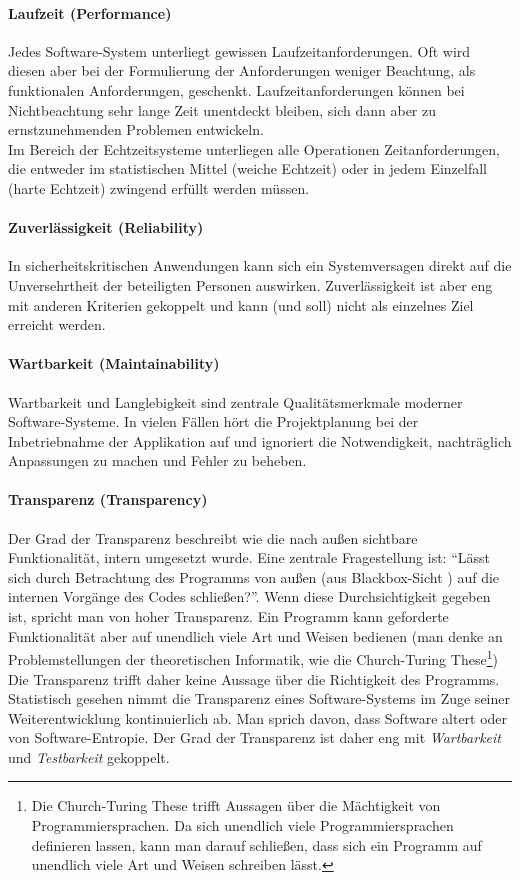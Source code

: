 \paragraph{Laufzeit (Performance)} Jedes Software-System unterliegt gewissen Laufzeitanforderungen. Oft wird diesen aber bei der Formulierung der Anforderungen weniger Beachtung, als funktionalen Anforderungen, geschenkt. Laufzeitanforderungen können bei Nichtbeachtung sehr lange Zeit unentdeckt bleiben, sich dann aber zu ernstzunehmenden Problemen entwickeln.\\
Im Bereich der Echtzeitsysteme unterliegen alle Operationen Zeitanforderungen, die entweder im statistischen Mittel (weiche Echtzeit) oder in jedem Einzelfall (harte Echtzeit) zwingend erfüllt werden müssen. \cite{hoffmann_software-qualitat_2013}

\paragraph{Zuverlässigkeit (Reliability)} In sicherheitskritischen Anwendungen kann sich ein Systemversagen direkt auf die Unversehrtheit der beteiligten Personen auswirken. Zuverlässigkeit ist aber eng mit anderen Kriterien gekoppelt und kann (und soll) nicht als einzelnes Ziel erreicht werden.

\paragraph{Wartbarkeit (Maintainability)} Wartbarkeit und Langlebigkeit sind zentrale Qualitätsmerkmale moderner Software-Systeme. \cite{rombach_design_2009} In vielen Fällen hört die Projektplanung bei der Inbetriebnahme der Applikation auf und ignoriert die Notwendigkeit, nachträglich Anpassungen zu machen und Fehler zu beheben.

\paragraph{Transparenz (Transparency)} Der Grad der Transparenz beschreibt wie die nach außen sichtbare Funktionalität, intern umgesetzt wurde. Eine zentrale Fragestellung ist: ``Lässt sich durch Betrachtung des Programms von außen (aus Blackbox-Sicht ) auf die internen Vorgänge des Codes schließen?''. Wenn diese Durchsichtigkeit gegeben ist, spricht man von hoher Transparenz. Ein Programm kann geforderte Funktionalität aber auf unendlich viele Art und Weisen bedienen (man denke an Problemstellungen der theoretischen Informatik, wie die Church-Turing These\footnote{Die Church-Turing These trifft Aussagen über die Mächtigkeit von Programmiersprachen. \cite{hoffmann_theoretische_2011} Da sich unendlich viele Programmiersprachen definieren lassen, kann man darauf schließen, dass sich ein Programm auf unendlich viele Art und Weisen schreiben lässt.}) Die Transparenz trifft daher keine Aussage über die Richtigkeit des Programms. Statistisch gesehen nimmt die Transparenz eines Software-Systems im Zuge seiner Weiterentwicklung kontinuierlich ab.\cite{hoffmann_software-qualitat_2013} Man sprich davon, dass Software altert oder von Software-Entropie. Der Grad der Transparenz ist daher eng mit \textit{Wartbarkeit} und \textit{Testbarkeit} gekoppelt. 

